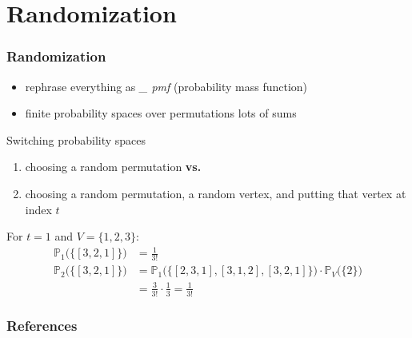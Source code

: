 \documentclass{beamer}
\begin{document}
\section{Randomization}
\begin{frame}
  \frametitle{Randomization}
  \begin{itemize}[<+->]
    \item rephrase everything as \emph{\_ pmf} (probability mass function)
    \item finite probability spaces over permutations \textrightarrow{} lots of sums
  \end{itemize}
  \onslide<+->
  \begin{alertblock}{Switching probability spaces}
    \begin{enumerate}[<+->]
      \item choosing a random permutation \textbf{vs.}
      
      \item choosing a random permutation, a random vertex, and putting that vertex at index $t$
    \end{enumerate}
    \onslide<+->
    For $t = 1$ and $V = \{1,2,3\}$:
    \begin{align*}
      \mathbb{P}_1\Big(\big\{[3,2,1]\big\}\Big) &= \frac{1}{3!} \\
      \mathbb{P}_2\Big(\big\{[3,2,1]\big\}\Big) &= \mathbb{P}_1\Big(\big\{[2,3,1], [3,1,2], [3,2,1]\big\}\Big) 
        \cdot \mathbb{P}_V\big(\{2\}\big) \\
        &= \frac{3}{3!} \cdot \frac{1}{3} = \frac{1}{3!}
    \end{align*}
  \end{alertblock}
\end{frame}

\begin{frame}
  \frametitle{References}
  
  \nocite{github-repo}
  
  
\end{frame}
\end{document}
